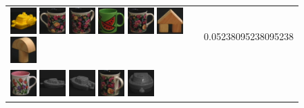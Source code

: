 \begin{figure}[tbp]
\begin{center}
\begin{tabular}{m{11cm} | m{3cm} |}
\includegraphics[width=1cm]{coil/beeld-15.eps}
\includegraphics[width=1cm]{coil/beeld-61.eps}
\includegraphics[width=1cm]{coil/beeld-63.eps}
\includegraphics[width=1cm]{coil/beeld-30.eps}
\includegraphics[width=1cm]{coil/beeld-60.eps}
\includegraphics[width=1cm]{coil/beeld-43.eps}
\includegraphics[width=1cm]{coil/beeld-4.eps}
& {\scriptsize 0.05238095238095238}
\\
\includegraphics[width=1cm]{coil/beeld-6.eps}
\includegraphics[width=1cm]{coil/beeld-24.eps}
\includegraphics[width=1cm]{coil/beeld-25.eps}
\includegraphics[width=1cm]{coil/beeld-64.eps}
\includegraphics[width=1cm]{coil/beeld-28.eps}

\end{tabular}
\end{center}
\end{figure}
